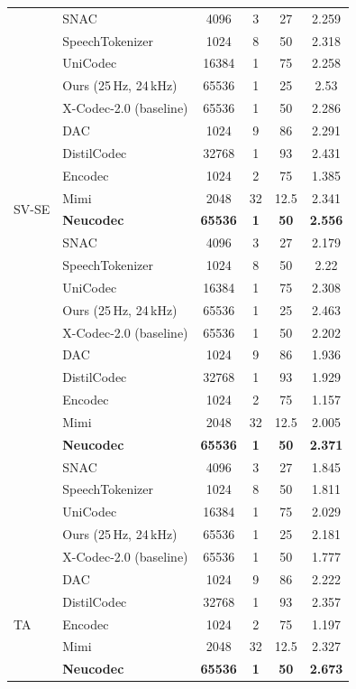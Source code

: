 \documentclass[preprint]{article}
\begin{document}
\begin{longtable}{llcccc}
  & SNAC & 4096 & 3 & 27 & 2.259 \\
  & SpeechTokenizer & 1024 & 8 & 50 & 2.318 \\
  & UniCodec & 16384 & 1 & 75 & 2.258 \\
  & Ours (25\,Hz, 24\,kHz) & 65536 & 1 & 25 & 2.53 \\
  & X-Codec-2.0 (baseline) & 65536 & 1 & 50 & 2.286 \\
\midrule
\multirow{8}{*}{SV-SE}
  & DAC & 1024 & 9 & 86 & 2.291 \\
  & DistilCodec & 32768 & 1 & 93 & 2.431 \\
  & Encodec & 1024 & 2 & 75 & 1.385 \\
  & Mimi & 2048 & 32 & 12.5 & 2.341 \\
  & \textbf{Neucodec} & \textbf{65536} & \textbf{1} & \textbf{50} & \textbf{2.556} \\
  & SNAC & 4096 & 3 & 27 & 2.179 \\
  & SpeechTokenizer & 1024 & 8 & 50 & 2.22 \\
  & UniCodec & 16384 & 1 & 75 & 2.308 \\
  & Ours (25\,Hz, 24\,kHz) & 65536 & 1 & 25 & 2.463 \\
  & X-Codec-2.0 (baseline) & 65536 & 1 & 50 & 2.202 \\
\newpage
\multirow{8}{*}{SW}
  & DAC & 1024 & 9 & 86 & 1.936 \\
  & DistilCodec & 32768 & 1 & 93 & 1.929 \\
  & Encodec & 1024 & 2 & 75 & 1.157 \\
  & Mimi & 2048 & 32 & 12.5 & 2.005 \\
  & \textbf{Neucodec} & \textbf{65536} & \textbf{1} & \textbf{50} & \textbf{2.371} \\
  & SNAC & 4096 & 3 & 27 & 1.845 \\
  & SpeechTokenizer & 1024 & 8 & 50 & 1.811 \\
  & UniCodec & 16384 & 1 & 75 & 2.029 \\
  & Ours (25\,Hz, 24\,kHz) & 65536 & 1 & 25 & 2.181 \\
  & X-Codec-2.0 (baseline) & 65536 & 1 & 50 & 1.777 \\
\midrule
\multirow{8}{*}{TA}
  & DAC & 1024 & 9 & 86 & 2.222 \\
  & DistilCodec & 32768 & 1 & 93 & 2.357 \\
  & Encodec & 1024 & 2 & 75 & 1.197 \\
  & Mimi & 2048 & 32 & 12.5 & 2.327 \\
  & \textbf{Neucodec} & \textbf{65536} & \textbf{1} & \textbf{50} & \textbf{2.673} \\

\end{longtable}
\end{document}
